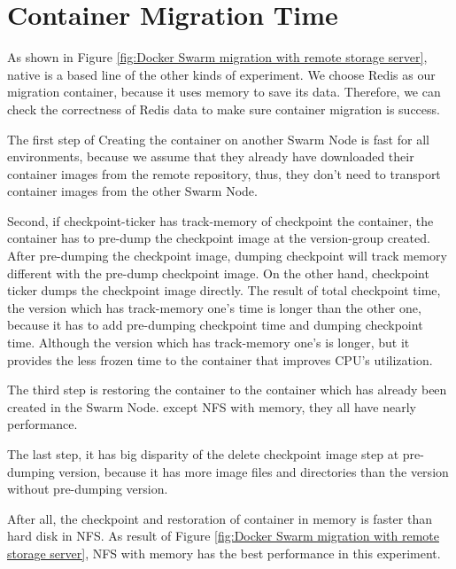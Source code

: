 \section{Container Migration Time}
As shown in Figure \ref{fig:Docker Swarm migration with remote storage server}, native is a based line of the other kinds of experiment. We choose Redis\cite{paksula2010persisting} as our migration container, because it uses memory to save its data. Therefore, we can check the correctness of Redis data to make sure container migration is success.

The first step of Creating the container on another Swarm Node is fast for all environments, because we assume that they already have downloaded their container images from the remote repository, thus, they don't need to transport container images from the other Swarm Node.

Second, if checkpoint-ticker has track-memory of checkpoint the container, the container has to pre-dump the checkpoint image at the version-group created. After pre-dumping the checkpoint image, dumping checkpoint will track memory different with the pre-dump checkpoint image.
On the other hand, checkpoint ticker dumps the checkpoint image directly. The result of total checkpoint time, the version which has track-memory one's time is longer than the other one, because it has to add pre-dumping checkpoint time and dumping checkpoint time.
Although the version which has track-memory one's is longer, but it provides the less frozen time to the container that improves CPU's utilization.

The third step is restoring the container to the container which has already been created in the Swarm Node. except NFS with memory, they all have nearly performance.

The last step, it has big disparity of the delete checkpoint image step at pre-dumping version, because it has more image files and directories than the version without pre-dumping version.

After all, the checkpoint and restoration of container in memory is faster than hard disk in NFS. As result of Figure \ref{fig:Docker Swarm migration with remote storage server}, NFS with memory has the best performance in this experiment.

